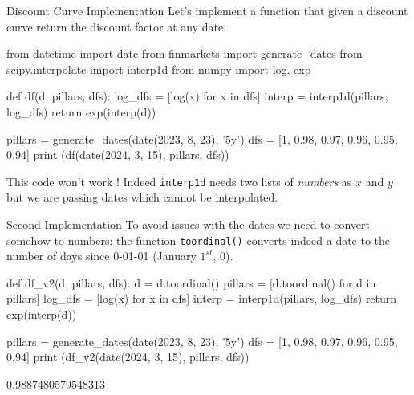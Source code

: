 \documentclass{beamer}
\begin{document}
\begin{frame}[fragile]{Discount Curve Implementation}
Let's implement a function that given a discount curve return the discount factor at any date.
\begin{ipython}
from datetime import date
from finmarkets import generate_dates
from scipy.interpolate import interp1d
from numpy import log, exp

def df(d, pillars, dfs):
    log_dfs = [log(x) for x in dfs]
    interp = interp1d(pillars, log_dfs)
    return exp(interp(d))
    
pillars = generate_dates(date(2023, 8, 23), '5y')
dfs = [1, 0.98, 0.97, 0.96, 0.95, 0.94]
print (df(date(2024, 3, 15), pillars, dfs))
\end{ipython}
{\color{red}This code won't work !} Indeed \texttt{interp1d} needs two lists of \emph{numbers} as $x$ and $y$ but we are passing dates which cannot be interpolated.
\end{frame}

\begin{frame}[fragile]{Second Implementation}
To avoid issues with the dates we need to convert somehow to numbers: the function \texttt{toordinal()} converts indeed a date to the number of days since 0-01-01 (January $1^{st}$, 0).
\begin{ipython}
def df_v2(d, pillars, dfs):
    d = d.toordinal()
    pillars = [d.toordinal() for d in pillars]
    log_dfs = [log(x) for x in dfs]
    interp = interp1d(pillars, log_dfs)
    return exp(interp(d))
    
pillars = generate_dates(date(2023, 8, 23), '5y')
dfs = [1, 0.98, 0.97, 0.96, 0.95, 0.94]
print (df_v2(date(2024, 3, 15), pillars, dfs))
\end{ipython}
\begin{ioutput}
0.9887480579548313
\end{ioutput}
\end{frame}
\end{document}
